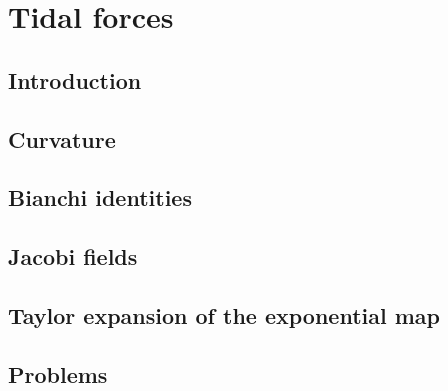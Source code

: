 \chapter{Tidal forces}

\section{Introduction}

\section{Curvature}

\section{Bianchi identities}

\section{Jacobi fields}

\section{Taylor expansion of the exponential map}

\section{Problems}

